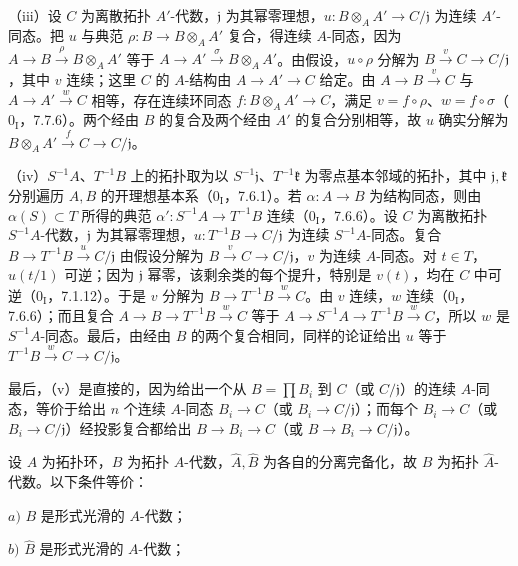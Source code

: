 （iii）设 $C$ 为离散拓扑 $A'$-代数，$\mathfrak j$ 为其幂零理想，$u:B\otimes_AA'\to C/\mathfrak j$ 为连续 $A'$-同态。把 $u$ 与典范 $\rho:B\to B\otimes_AA'$ 复合，得连续 $A$-同态，因为 $A\to B\xrightarrow{\rho}B\otimes_AA'$ 等于 $A\to A'\xrightarrow{\sigma}B\otimes_AA'$。由假设，$u\circ\rho$ 分解为 $B\xrightarrow{v}C\to C/\mathfrak j$，其中 $v$ 连续；这里 $C$ 的 $A$-结构由 $A\to A'\to C$ 给定。由 $A\to B\xrightarrow{v}C$ 与 $A\to A'\xrightarrow{w}C$ 相等，存在连续环同态 $f:B\otimes_AA'\to C$，满足 $v=f\circ\rho$、$w=f\circ\sigma$（$0_{\mathrm I}$，7.7.6）。两个经由 $B$ 的复合及两个经由 $A'$ 的复合分别相等，故 $u$ 确实分解为 $B\otimes_AA'\xrightarrow{f}C\to C/\mathfrak j$。

（iv）$S^{-1}A$、$T^{-1}B$ 上的拓扑取为以 $S^{-1}\mathfrak j$、$T^{-1}\mathfrak k$ 为零点基本邻域的拓扑，其中 $\mathfrak j,\mathfrak k$ 分别遍历 $A,B$ 的开理想基本系（$0_{\mathrm I}$，7.6.1）。若 $\alpha:A\to B$ 为结构同态，则由 $\alpha(S)\subset T$ 所得的典范 $\alpha':S^{-1}A\to T^{-1}B$ 连续（$0_{\mathrm I}$，7.6.6）。设 $C$ 为离散拓扑 $S^{-1}A$-代数，$\mathfrak j$ 为其幂零理想，$u:T^{-1}B\to C/\mathfrak j$ 为连续 $S^{-1}A$-同态。复合 $B\to T^{-1}B\xrightarrow{u}C/\mathfrak j$ 由假设分解为 $B\xrightarrow{v}C\to C/\mathfrak j$，$v$ 为连续 $A$-同态。对 $t\in T$，$u(t/1)$ 可逆；因为 $\mathfrak j$ 幂零，该剩余类的每个提升，特别是 $v(t)$，均在 $C$ 中可逆（$0_{\mathrm I}$，7.1.12）。于是 $v$ 分解为 $B\to T^{-1}B\xrightarrow{w}C$。由 $v$ 连续，$w$ 连续（$0_{\mathrm I}$，7.6.6）；而且复合 $A\to B\to T^{-1}B\xrightarrow{w}C$ 等于 $A\to S^{-1}A\to T^{-1}B\xrightarrow{w}C$，所以 $w$ 是 $S^{-1}A$-同态。最后，由经由 $B$ 的两个复合相同，同样的论证给出 $u$ 等于 $T^{-1}B\xrightarrow{w}C\to C/\mathfrak j$。

最后，（v）是直接的，因为给出一个从 $B=\prod B_i$ 到 $C$（或 $C/\mathfrak j$）的连续 $A$-同态，等价于给出 $n$ 个连续 $A$-同态 $B_i\to C$（或 $B_i\to C/\mathfrak j$）；而每个 $B_i\to C$（或 $B_i\to C/\mathfrak j$）经投影复合都给出 $B\to B_i\to C$（或 $B\to B_i\to C/\mathfrak j$）。

设 $A$ 为拓扑环，$B$ 为拓扑 $A$-代数，$\widehat A,\widehat B$ 为各自的分离完备化，故 $\widehat B$ 为拓扑 $\widehat A$-代数。以下条件等价：

$a)$ $B$ 是形式光滑的 $A$-代数；

$b)$ $\widehat B$ 是形式光滑的 $A$-代数；

